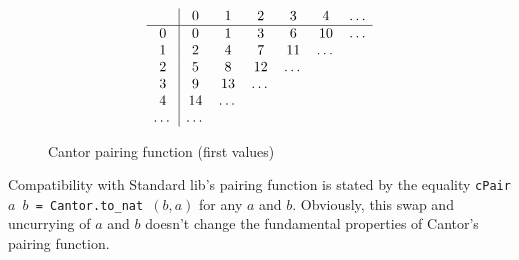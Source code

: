       \begin{figure}[h]
        \centering

         \[
        \begin{array}[h]{c|cccccc}
          &0&1&2&3&4&\dots \\
          \hline 
          0&0&1&3& 6 & 10&\dots \\
          1&2&4&7&11& \dots& \\
          2&5&8 & 12& \dots&& \\
            3&9&13&\dots & && \\
          4&14&\dots&&&&\\
          \dots&\dots&&&&&\\
        \end{array}
        \]
        
        \caption{Cantor pairing function (first values)\label{fig:cpair}}
      \end{figure}


      \begin{remark}
        Compatibility with Standard lib's pairing function is stated
        by the equality \texttt{cPair $a$ $b$ = Cantor.to\_nat $(b,a)$} for any $a$ and $b$. Obviously, this swap and uncurrying of $a$ and $b$ doesn't change the fundamental properties of Cantor's pairing function.
      \end{remark}